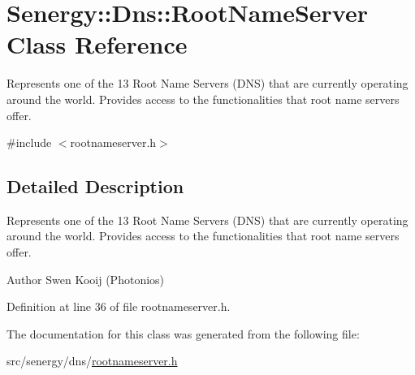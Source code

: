 \hypertarget{class_senergy_1_1_dns_1_1_root_name_server}{\section{Senergy\-:\-:Dns\-:\-:Root\-Name\-Server Class Reference}
\label{class_senergy_1_1_dns_1_1_root_name_server}
}


Represents one of the 13 Root Name Servers (D\-N\-S) that are currently operating around the world. Provides access to the functionalities that root name servers offer.  




{\ttfamily \#include $<$rootnameserver.\-h$>$}



\subsection{Detailed Description}
Represents one of the 13 Root Name Servers (D\-N\-S) that are currently operating around the world. Provides access to the functionalities that root name servers offer. 

\begin{DoxyAuthor}{Author}
Swen Kooij (Photonios) 
\end{DoxyAuthor}


Definition at line 36 of file rootnameserver.\-h.



The documentation for this class was generated from the following file\-:\begin{DoxyCompactItemize}
\item 
src/senergy/dns/\hyperlink{rootnameserver_8h}{rootnameserver.\-h}\end{DoxyCompactItemize}
